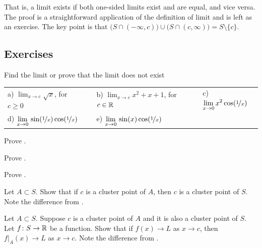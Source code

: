That is, a limit exists if both one-sided limits exist and are equal, and
vice versa.  The
proof is a straightforward application of the definition of limit
and is left as an exercise.  The key point is that
$\bigl( S \cap (-\infty,c) \bigr) \cup \bigl( S \cap (c,\infty) \bigr)
= S \setminus \{ c \}$.

\subsection{Exercises}

\begin{exercise}
Find the limit or prove that the limit does not exist

\medskip

\noindent
\begin{tabular}{lllll}
a)
$\displaystyle
\lim_{x\to c} \sqrt{x}
$, for $c \geq 0$
& &
b)
$\displaystyle
\lim_{x\to c} x^2+x+1
$, for $c \in {\mathbb{R}}$
& &
c)
$\displaystyle
\lim_{x\to 0} x^2 \cos (\nicefrac{1}{x})
$
\\
d)
$\displaystyle
\lim_{x\to 0}\, \sin(\nicefrac{1}{x}) \cos (\nicefrac{1}{x})
$
& &
e)
$\displaystyle
\lim_{x\to 0}\, \sin(x) \cos (\nicefrac{1}{x})
$ & 
\end{tabular}
\end{exercise}

\begin{exercise}
Prove .
\end{exercise}

\begin{exercise}
Prove .
\end{exercise}

\begin{exercise}
Prove .
\end{exercise}

\begin{exercise}
Let $A \subset S$.  Show that if $c$ is a cluster point of $A$, then $c$
is a cluster point of $S$.  Note the difference from
.
\end{exercise}

\begin{exercise} \label{exercise:restrictionlimitexercise}
Let $A \subset S$.  Suppose $c$ is a cluster point of $A$ and
it is also a cluster point of $S$.
Let $f \colon S \to {\mathbb{R}}$ be a function.  Show that if
$f(x) \to L$ as $x \to c$, then
$f|_A(x) \to L$ as $x \to c$.
Note the difference from
.
\end{exercise}

